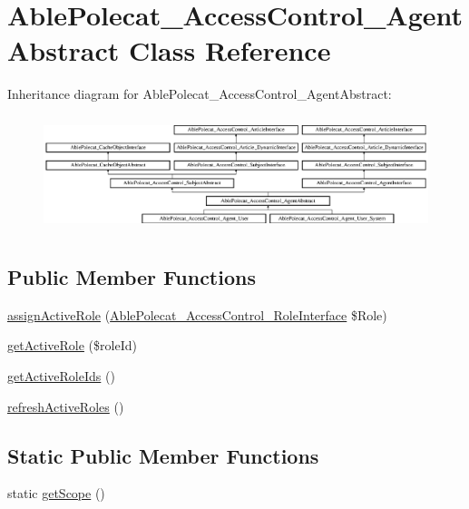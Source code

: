 \hypertarget{class_able_polecat___access_control___agent_abstract}{}\section{Able\+Polecat\+\_\+\+Access\+Control\+\_\+\+Agent\+Abstract Class Reference}
\label{class_able_polecat___access_control___agent_abstract}
Inheritance diagram for Able\+Polecat\+\_\+\+Access\+Control\+\_\+\+Agent\+Abstract\+:\begin{figure}[H]
\begin{center}
\leavevmode
\includegraphics[height=3.414634cm]{class_able_polecat___access_control___agent_abstract}
\end{center}
\end{figure}
\subsection*{Public Member Functions}
\begin{DoxyCompactItemize}
\item 
\hyperlink{class_able_polecat___access_control___agent_abstract_aa20eaa314f35da6155b74a1f631393b8}{assign\+Active\+Role} (\hyperlink{interface_able_polecat___access_control___role_interface}{Able\+Polecat\+\_\+\+Access\+Control\+\_\+\+Role\+Interface} \$Role)
\item 
\hyperlink{class_able_polecat___access_control___agent_abstract_a368167873f151dd37d88e11f6a5f10ad}{get\+Active\+Role} (\$role\+Id)
\item 
\hyperlink{class_able_polecat___access_control___agent_abstract_a8db7ea97d01a0687141844be9a76f250}{get\+Active\+Role\+Ids} ()
\item 
\hyperlink{class_able_polecat___access_control___agent_abstract_af655f2dcc765ece1fcd66a407d53c4cb}{refresh\+Active\+Roles} ()
\end{DoxyCompactItemize}
\subsection*{Static Public Member Functions}
\begin{DoxyCompactItemize}
\item 
static \hyperlink{class_able_polecat___access_control___agent_abstract_ad9ade868bd136d32967059d1cccb3e92}{get\+Scope} ()
\end{DoxyCompactItemize}
